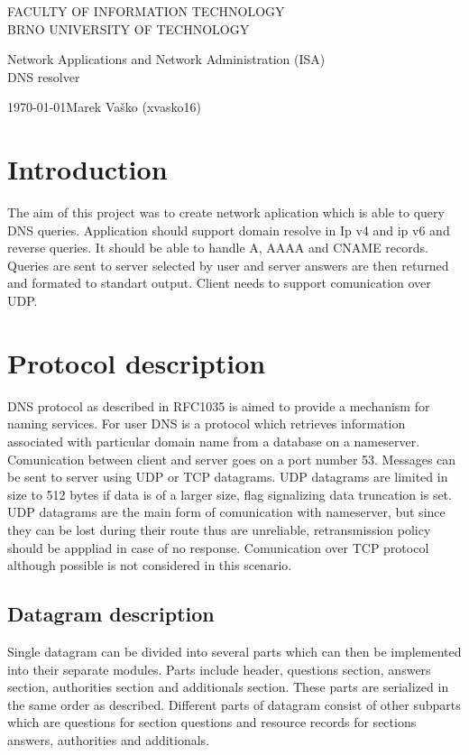 \documentclass[11pt, a4paper]{article}
\begin{document}
\begin{titlepage}
\begin{center}

{\Huge\textsc{FACULTY OF INFORMATION TECHNOLOGY\\BRNO UNIVERSITY OF TECHNOLOGY}}

{\LARGE  Network Applications and Network Administration (ISA)}{\Huge\\DNS resolver}

\end{center}
{\Large \today \hfill Marek Vaško (xvasko16)}
\end{titlepage}

\tableofcontents
\newpage

\section{Introduction}
The aim of this project was to create network aplication which is able to query DNS queries. 
Application should support domain resolve in Ip v4 and ip v6 and reverse queries. It should 
be able to handle A, AAAA and CNAME records. Queries are sent to server selected by user and
server answers are then returned and formated to standart output. Client needs to support 
comunication over UDP.
\section{Protocol description}
DNS protocol as described in RFC1035 is aimed to provide a mechanism for naming services. For user
DNS is a protocol which retrieves information associated with particular domain name from a 
database on a nameserver. Comunication between client and server goes on a port number 53. Messages
can be sent to server using UDP or TCP datagrams. UDP datagrams are limited in size to 512 bytes if  
data is of a larger size, flag signalizing data truncation is set. UDP datagrams are the main form
of comunication with nameserver, but since they can be lost during their route thus are unreliable, 
retransmission policy should be apppliad in case of no response. Comunication over TCP protocol 
although possible is not considered in this scenario.
\subsection{Datagram description}
Single datagram can be divided into several parts which can then be implemented into their separate 
modules. Parts include header, questions section, answers section, authorities section and additionals
section. These parts are serialized in the same order as described. Different parts of datagram consist
of other subparts which are questions for section questions and resource records for sections answers, 
authorities and additionals.
\end{document}
